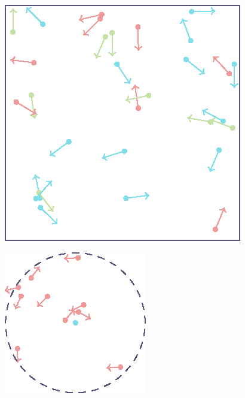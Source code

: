 \documentclass[10pt]{beamer}
\begin{document}
	\begin{frame}

		\begin{multicols}{2}
			\begin{figure}[H]
				\centering
				\includegraphics{figure-gas.eps}
			\end{figure}
			\begin{figure}[H]
				\centering
				\includegraphics{figure-gas-near.eps}
			\end{figure}
		\end{multicols}
	\end{frame}

	\begin{frame}
	\end{frame}
\end{document}
